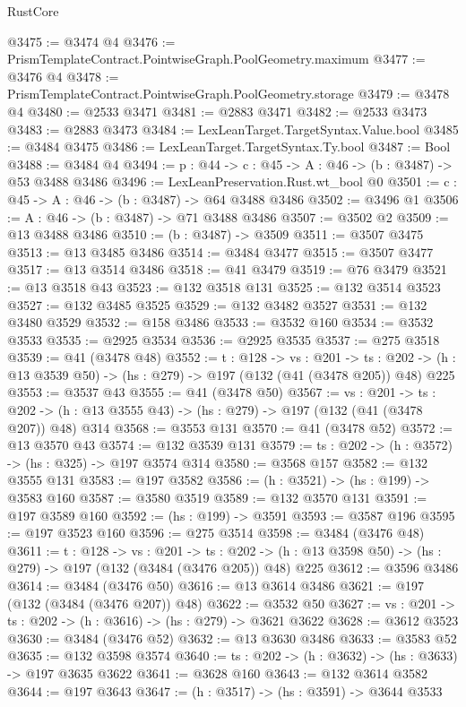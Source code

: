 \begin{lexlean}{RustCore}
\begin{coremodule}
@3475 := @3474 @4
@3476 := PrismTemplateContract.PointwiseGraph.PoolGeometry.maximum
@3477 := @3476 @4
@3478 := PrismTemplateContract.PointwiseGraph.PoolGeometry.storage
@3479 := @3478 @4
@3480 := @2533 @3471
@3481 := @2883 @3471
@3482 := @2533 @3473
@3483 := @2883 @3473
@3484 := LexLeanTarget.TargetSyntax.Value.bool
@3485 := @3484 @3475
@3486 := LexLeanTarget.TargetSyntax.Ty.bool
@3487 := Bool
@3488 := @3484 @4
@3494 := {p : @44} -> {c : @45} -> {A : @46} -> (b : @3487) -> @53 @3488 @3486
@3496 := LexLeanPreservation.Rust.wt_bool @0
@3501 := {c : @45} -> {A : @46} -> (b : @3487) -> @64 @3488 @3486
@3502 := @3496 @1
@3506 := {A : @46} -> (b : @3487) -> @71 @3488 @3486
@3507 := @3502 @2
@3509 := @13 @3488 @3486
@3510 := (b : @3487) -> @3509
@3511 := @3507 @3475
@3513 := @13 @3485 @3486
@3514 := @3484 @3477
@3515 := @3507 @3477
@3517 := @13 @3514 @3486
@3518 := @41 @3479
@3519 := @76 @3479
@3521 := @13 @3518 @43
@3523 := @132 @3518 @131
@3525 := @132 @3514 @3523
@3527 := @132 @3485 @3525
@3529 := @132 @3482 @3527
@3531 := @132 @3480 @3529
@3532 := @158 @3486
@3533 := @3532 @160
@3534 := @3532 @3533
@3535 := @2925 @3534
@3536 := @2925 @3535
@3537 := @275 @3518
@3539 := @41 (@3478 @48)
@3552 := {t : @128} ->
  {vs : @201} ->
  {ts : @202} -> (h : @13 @3539 @50) -> (hs : @279) -> @197 (@132 (@41 (@3478 @205)) @48) @225
@3553 := @3537 @43
@3555 := @41 (@3478 @50)
@3567 := {vs : @201} ->
  {ts : @202} -> (h : @13 @3555 @43) -> (hs : @279) -> @197 (@132 (@41 (@3478 @207)) @48) @314
@3568 := @3553 @131
@3570 := @41 (@3478 @52)
@3572 := @13 @3570 @43
@3574 := @132 @3539 @131
@3579 := {ts : @202} -> (h : @3572) -> (hs : @325) -> @197 @3574 @314
@3580 := @3568 @157
@3582 := @132 @3555 @131
@3583 := @197 @3582
@3586 := (h : @3521) -> (hs : @199) -> @3583 @160
@3587 := @3580 @3519
@3589 := @132 @3570 @131
@3591 := @197 @3589 @160
@3592 := (hs : @199) -> @3591
@3593 := @3587 @196
@3595 := @197 @3523 @160
@3596 := @275 @3514
@3598 := @3484 (@3476 @48)
@3611 := {t : @128} ->
  {vs : @201} ->
  {ts : @202} -> (h : @13 @3598 @50) -> (hs : @279) -> @197 (@132 (@3484 (@3476 @205)) @48) @225
@3612 := @3596 @3486
@3614 := @3484 (@3476 @50)
@3616 := @13 @3614 @3486
@3621 := @197 (@132 (@3484 (@3476 @207)) @48)
@3622 := @3532 @50
@3627 := {vs : @201} -> {ts : @202} -> (h : @3616) -> (hs : @279) -> @3621 @3622
@3628 := @3612 @3523
@3630 := @3484 (@3476 @52)
@3632 := @13 @3630 @3486
@3633 := @3583 @52
@3635 := @132 @3598 @3574
@3640 := {ts : @202} -> (h : @3632) -> (hs : @3633) -> @197 @3635 @3622
@3641 := @3628 @160
@3643 := @132 @3614 @3582
@3644 := @197 @3643
@3647 := (h : @3517) -> (hs : @3591) -> @3644 @3533

\end{coremodule}
\end{lexlean}

